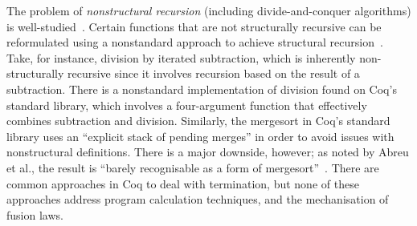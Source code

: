 \documentclass[a4paper,anonymous, UKenglish,cleveref, autoref, thm-restate]{lipics-v2021}
\newcommand{\haskell}[1]{\texttt{#1}}
\begin{document}
The problem of \emph{nonstructural recursion} (including
divide-and-conquer algorithms) is well-studied~\cite{BoveKS16}.
Certain functions that are not structurally recursive can be reformulated using
a nonstandard approach to achieve structural recursion~\cite{AbreuDHJMS23}.
Take, for instance, division by iterated subtraction, which is inherently
non-structurally recursive since it involves recursion based on the result of a
subtraction. There is a nonstandard implementation of division found on Coq's
standard library, which involves a four-argument function that effectively
combines subtraction and division. Similarly, the mergesort in Coq's standard
library uses an ``explicit stack of pending merges'' in order to avoid issues
with nonstructural definitions. There is a major downside, however; as noted by
Abreu et al., the result is ``barely recognisable as a form of
mergesort''~\cite{AbreuDHJMS23}.
There are common approaches in Coq to deal with termination, but none of these
approaches address program calculation techniques, and the mechanisation of
fusion laws.


\end{document}
